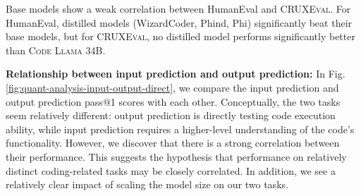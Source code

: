 \documentclass{article}
\newcommand{\benchmark}{\textsc{CRUXEval}\xspace}
\newcommand{\codellamalarge}{\textsc{Code Llama 34B}\xspace}
\begin{document}
\begin{tcolorbox}[colback=lightgreen, boxrule=0pt, arc=10pt, outer arc=10pt]
Base models show a weak correlation between HumanEval and \benchmark. For HumanEval, distilled models (WizardCoder, Phind, Phi) significantly beat their base models, but for \benchmark, no distilled model performs significantly better than \codellamalarge.
\end{tcolorbox}

\textbf{Relationship between input prediction and output prediction:}
In Fig. \ref{fig:quant-analysis-input-output-direct}, we compare the input prediction and output prediction pass@1 scores with each other. Conceptually, the two tasks seem relatively different: output prediction is directly testing code execution ability, while input prediction requires a higher-level understanding of the code's functionality. However, we discover that there is a strong correlation between their performance. This suggests the hypothesis that performance on relatively distinct coding-related tasks may be closely correlated. In addition, we see a relatively clear impact of scaling the model size on our two tasks.
\end{document}
